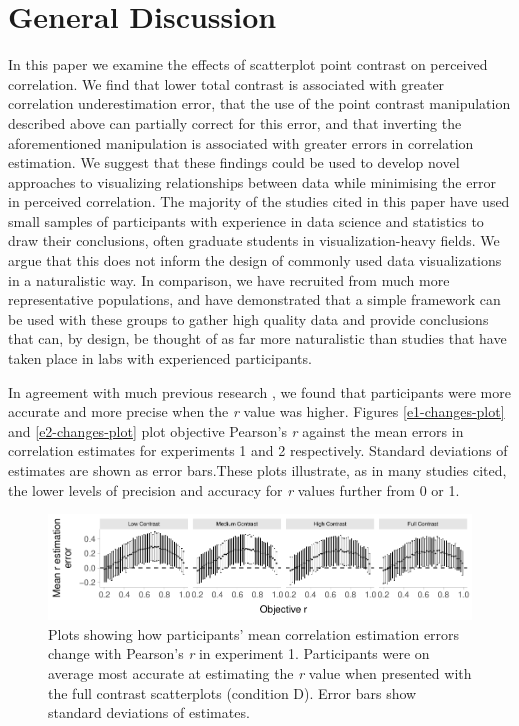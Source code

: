\documentclass[preprint, 3p,
authoryear]{elsarticle} %
\begin{document}
\hypertarget{general-discussion}{%
\section{General Discussion}\label{general-discussion}}

In this paper we examine the effects of scatterplot point contrast on
perceived correlation. We find that lower total contrast is associated
with greater correlation underestimation error, that the use of the
point contrast manipulation described above can partially correct for
this error, and that inverting the aforementioned manipulation is
associated with greater errors in correlation estimation. We suggest
that these findings could be used to develop novel approaches to
visualizing relationships between data while minimising the error in
perceived correlation. The majority of the studies cited in this paper
have used small samples of participants with experience in data science
and statistics to draw their conclusions, often graduate students in
visualization-heavy fields. We argue that this does not inform the
design of commonly used data visualizations in a naturalistic way. In
comparison, we have recruited from much more representative populations,
and have demonstrated that a simple framework can be used with these
groups to gather high quality data and provide conclusions that can, by
design, be thought of as far more naturalistic than studies that have
taken place in labs with experienced participants.

In agreement with much previous research
\citep{rensink_2010, rensink_2012, rensink_2014, rensink_2017, pollack_1960},
we found that participants were more accurate and more precise when the
\emph{r} value was higher. Figures \ref{e1-changes-plot} and
\ref{e2-changes-plot} plot objective Pearson's \emph{r} against the mean
errors in correlation estimates for experiments 1 and 2 respectively.
Standard deviations of estimates are shown as error bars.These plots
illustrate, as in many studies cited, the lower levels of precision and
accuracy for \emph{r} values further from 0 or 1.

\begin{figure}

{\centering \includegraphics{contrast_and_scatterplots_files/figure-latex/changes-with-r-e1-1} 

}

\caption{\label{e1-changes-plot}Plots showing how participants' mean correlation estimation errors change with Pearson's \textit{r} in experiment 1. Participants were on average most accurate at estimating the \textit{r} value when presented with the full contrast scatterplots (condition D). Error bars show standard deviations of estimates.}\label{fig:changes-with-r-e1}
\end{figure}
\end{document}
